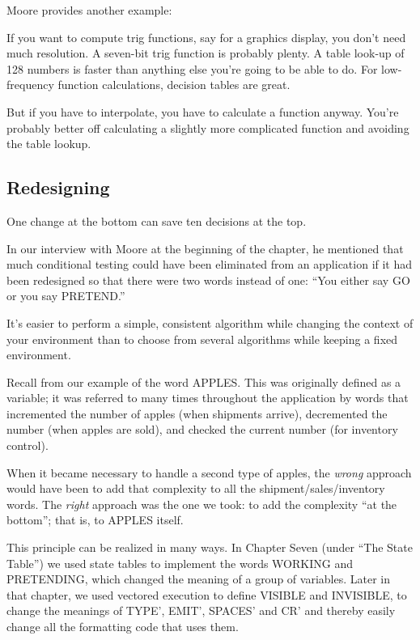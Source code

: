 \bigskip\blackline{2ex}
\noindent Moore provides another example:
\begin{tfquot}
If you want to compute trig functions, say for a graphics display, you don't
need much resolution. A seven-bit trig function is probably plenty. A table
look-up of 128 numbers is faster than anything else you're going to be able
to do. For low-frequency function calculations, decision tables are great.

But if you have to interpolate, you have to calculate a function anyway.
You're probably better off calculating a slightly more complicated function
and avoiding the table lookup.
\end{tfquot}\blackline{1ex}
\subsection{Redesigning}
\begin{tip}
One change at the bottom can save ten decisions at the top.
\end{tip}
In our interview with Moore at the beginning of the chapter, he mentioned
that much conditional testing could have been eliminated from an
application if it had been redesigned so that there were two words instead
of one: ``You either say GO or you say PRETEND.''

It's easier to perform a simple, consistent algorithm while changing
the context of your environment than to choose from several algorithms
while keeping a fixed environment.

Recall from  our example of the word APPLES. This
was originally defined as a variable; it was referred to many times
throughout the application by words that incremented the number of
apples (when shipments arrive), decremented the number (when apples are
sold), and checked the current number (for inventory control).

When it became necessary to handle a second type of apples, the
\emph{wrong} approach would have been to add that complexity to all the
shipment/sales/inventory words. The \emph{right} approach was the one we
took: to add the complexity ``at the bottom''; that is, to APPLES itself.

This principle can be realized in many ways. In Chapter Seven
(under ``The State Table'') we used state tables to implement the words
WORKING and PRETENDING, which changed the meaning of a group
of variables. Later in that chapter, we used vectored execution to define
VISIBLE and INVISIBLE, to change the meanings of TYPE', EMIT',
SPACES' and CR' and thereby easily change all the formatting code that
uses them.

